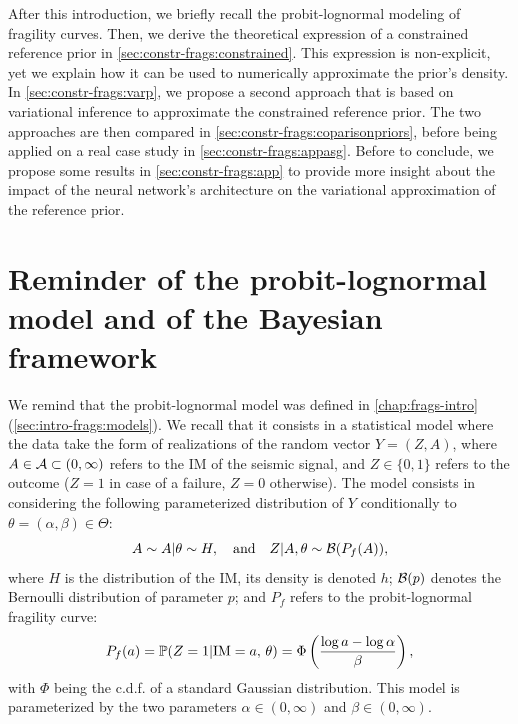 After this introduction, we briefly recall the probit-lognormal modeling of %
fragility curves. Then, we derive the theoretical expression of a constrained reference prior in \cref{sec:constr-frags:constrained}.
This expression is non-explicit, yet we explain how it can be used to numerically approximate the prior's density.
In \cref{sec:constr-frags:varp}, we propose a second approach that is based on variational inference to approximate the constrained reference prior.
The two approaches are then compared in \cref{sec:constr-frags:coparisonpriors}, before being applied on a real case study in \cref{sec:constr-frags:appasg}.
Before to conclude, we propose some results in \cref{sec:constr-frags:app} to provide more insight about the impact of the neural network's architecture on the variational approximation of the reference prior.








\section{Reminder of the probit-lognormal model and of the Bayesian framework}\label{sec:constr-frags:model}


We remind that the probit-lognormal model was defined in   \cref{chap:frags-intro} (\cref{sec:intro-frags:models}). We recall that it consists in a statistical model where the data take the form of realizations of the random vector $Y=(Z,A)$, where $A\in\mathcal{A}\subset(0,\infty)$ refers to the IM of the seismic signal, and $Z\in\{0,1\}$ refers to the outcome ($Z=1$ in case of a failure, $Z=0$ otherwise). The model consists in considering
the following parameterized distribution of $Y$ conditionally to $\theta=(\alpha,\beta)\in\Theta$:
    \begin{equation}
        A\sim A|\theta\sim H,\quad\text{and}\quad Z|A,\theta\sim\mathcal{B}(P_f(A)),
    \end{equation}
where $H$ is the distribution of the IM, its density is denoted $h$; $\mathcal{B}(p)$ denotes the Bernoulli distribution of parameter $p$; and $P_f$ refers to the probit-lognormal fragility curve:
\begin{equation}
    P_f(a) = \mathbb{P}(Z=1|\text{IM}=a,\,\theta) = \Phi\left(\frac{\log a-\log\alpha}{\beta}\right),
\end{equation}
with $\Phi$ being the c.d.f. of a standard Gaussian distribution. This model is parameterized by the two parameters $\alpha\in(0,\infty)$ and $\beta\in(0,\infty)$. %

